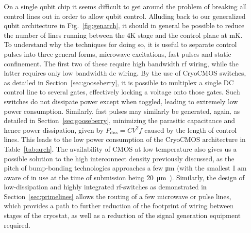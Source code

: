 On a single qubit chip it seems difficult to get around the problem of breaking all control lines out in order to allow qubit control. Alluding
back to our generalized qubit architecture in Fig.~\ref{fig:genarch}, it should in general be possible to reduce the number of lines running between the 4K stage
and the control plane at mK. To understand why the techniques for doing so, it is useful to separate control pulses into three general forms, microwave excitations,
fast pulses and static confinement. The first two of these require high bandwidth rf wiring, while the latter requires only low bandwidth dc wiring. By the use of
CryoCMOS switches, as detailed in Section~\ref{sec:gooseberry}, it is possible to multiplex a single DC control line to several gates, effectively locking
a voltage onto those gates. Such switches do not dissipate power except when toggled, leading to extremely low power consumption. Similarly, fast pulses may similarly
be generated, again, as detailed in Section~\ref{sec:gooseberry}, minimizing the parasitic capacitance and hence power dissipation, given by $P_\textrm{diss} = CV^2f$
caused by the length of control lines. This leads to the low power consumption of the CryoCMOS architecture in Table~\ref{tab:arch}. The availability of CMOS at low
temperature also gives us a possible solution to the high interconnect density previously discussed, as the pitch of bump-bonding technologies approaches a few \si{\micro\meter}
(with the smallest I am aware of in use at the time of submission being \SI{20}{\micro\meter}~\cite{4550089}). Similarly, the design of low-dissipation and highly integrated
rf-switches as demonstrated in Section~\ref{sec:primelines} allows the routing of a few microwave or pulse lines, which provides a path to further reduction of the footprint
of wiring between stages of the cryostat, as well as a reduction of the signal generation equipment required.

